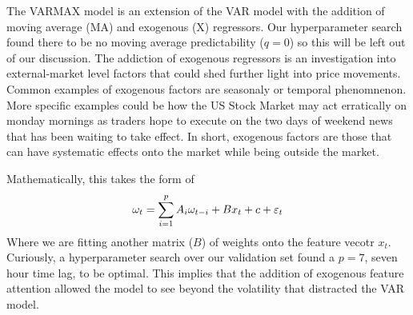 The VARMAX model is an extension of the VAR model with the addition of moving average (MA) and exogenous (X) regressors. Our hyperparameter search found there to be no moving average predictability ($q=0$) so this will be left out of our discussion. The addiction of exogenous regressors is an investigation into external-market level factors that could shed further light into price movements. Common examples of exogenous factors are seasonaly or temporal phenomnenon. More specific examples could be how the US Stock Market may act erratically on monday mornings as traders hope to execute on the two days of weekend news that has been waiting to take effect. In short, exogenous factors are those that can have systematic effects onto the market while being outside the market. 

Mathematically, this takes the form of \cite{varmax}
\[
\omega_{t}=\sum_{i=1}^{p} A_{i}\omega_{t-i} + B x_t + c+\varepsilon_{t}\\
\]
Where we are fitting another matrix ($B$) of weights onto the feature vecotr $x_t$. Curiously, a hyperparameter search over our validation set found a $p=7$, seven hour time lag, to be optimal. This implies that the addition of exogenous feature attention allowed the model to see beyond the volatility that distracted the VAR model. 